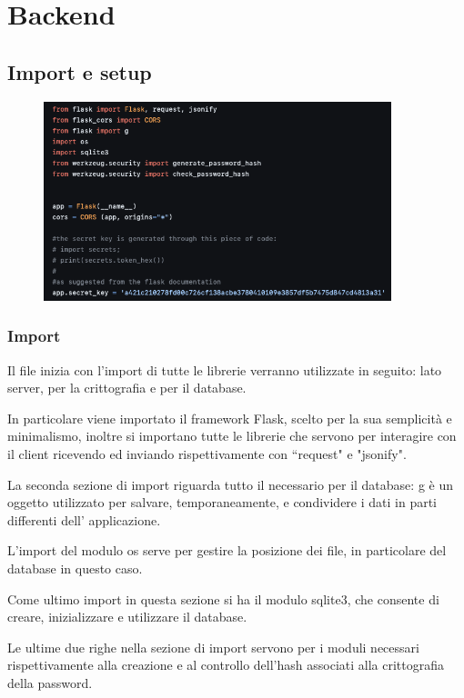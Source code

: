 \documentclass{article}
\begin{document}
\section{Backend}

\subsection{Import e setup}

\begin{figure}[H]
    \centering
    \includegraphics[width=0.9\textwidth]{images/import.png}
\end{figure}

\subsubsection{Import}
Il file inizia con l’import di tutte le librerie verranno utilizzate in seguito: lato server, per la crittografia e per il database.

In particolare viene importato il framework Flask, scelto per la sua semplicità e minimalismo, inoltre si importano tutte le librerie che servono per interagire con il client ricevendo ed inviando rispettivamente con “request" e "jsonify".

La seconda sezione di import riguarda tutto il necessario per il database: g è un oggetto utilizzato per salvare, temporaneamente, e condividere i dati in parti differenti dell' applicazione.

L’import del modulo os serve per gestire la posizione dei file, in particolare del database in questo caso.

Come ultimo import in questa sezione si ha il modulo sqlite3, che consente di creare, inizializzare e utilizzare il database.


Le ultime due righe nella sezione di import servono per i moduli necessari rispettivamente alla creazione e al controllo dell’hash associati alla crittografia della password. 
\end{document}
